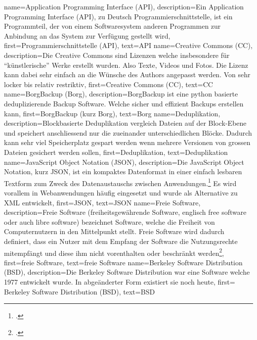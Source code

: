 {
    name={Application Programming Interface (API)},
    description={Ein Application Programming Interface (API), zu Deutsch
      Programmierschnittstelle, ist ein Programmteil, der von einem
      Softwaresystem anderen Programmen zur Anbindung an das System zur
      Verfügung gestellt wird},
    first={Programmierschnittstelle (API)},
    text={API}
}
{
    name={Creative Commons (CC)},
    description={Die Creative Commons sind Lizenzen welche insbesondere für
      ``künstlerische'' Werke erstellt wurden. Also Texte, Videos und Fotos.
      Die Lizenz kann dabei sehr einfach an die Wünsche des Authors angepasst
      werden. Von sehr locker bis relativ restriktiv},
    first={Creative Commons (CC)},
    text={CC}
}
{
    name={BorgBackup (Borg)},
    description={BorgBackup ist eine python basierte deduplizierende Backup
      Software. Welche sicher und effizient Backups erstellen kann},
    first={BorgBackup (kurz Borg)},
    text={Borg}
}
{
    name={Deduplikation},
    description={Blockbasierte Deduplikation vergleich Dateien auf der
      Block-Ebene und speichert anschliessend nur die zueinander
      unterschiedlichen Blöcke. Dadurch kann sehr viel Speicherplatz gespart
      werden wenn mehrere Versionen von grossen Dateien gesichert werden
      sollen},
    first={Deduplikation},
    text={Deduplikation}
}
{
    name={JavaScript Object Notation (JSON)},
    description={Die JavaScript Object Notation, kurz JSON, ist ein
      kompaktes Datenformat in einer einfach lesbaren Textform zum Zweck des
      Datenaustauschs zwischen Anwendungen.\footcite{json} Es wird vorallem in
      Webanwendungen häufig eingesetzt und wurde als Alternative zu XML entwickelt},
    first={JSON},
    text={JSON}
}
{
    name={Freie Software},
    description={Freie Software (freiheitsgewährende Software, englisch free
      software oder auch libre software) bezeichnet Software, welche die
      Freiheit von Computernutzern in den Mittelpunkt stellt. Freie Software
      wird dadurch definiert, dass ein Nutzer mit dem Empfang der
      Software die Nutzungsrechte mitempfängt und diese ihm nicht vorenthalten
      oder beschränkt werden\footcite{libre}},
    first={freie Software},
    text={freie Software}
}
{
    name={Berkeley Software Distribution (BSD)},
    description={Die Berkeley Software Distribution war eine Software welche
      1977 entwickelt wurde. In abgeänderter Form existiert sie noch heute},
    first={ Berkeley Software Distribution (BSD)},
    text={BSD}
}
